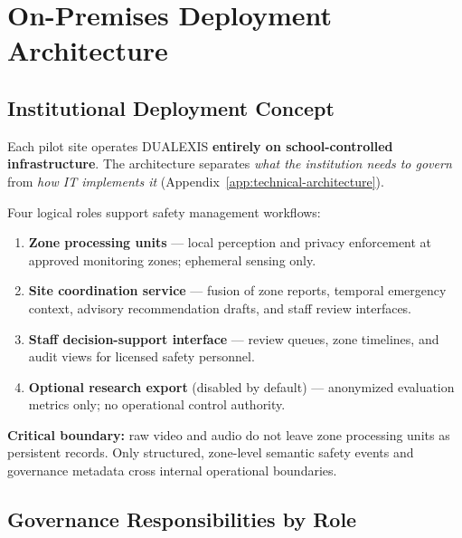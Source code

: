 \section{On-Premises Deployment Architecture}
\label{sec:edge-infrastructure-req}

\subsection{Institutional Deployment Concept}

Each pilot site operates DUALEXIS \textbf{entirely on school-controlled infrastructure}.
The architecture separates \emph{what the institution needs to govern} from \emph{how IT
implements it} (Appendix~\ref{app:technical-architecture}).

Four logical roles support safety management workflows:

\begin{enumerate}[noitemsep]
  \item \textbf{Zone processing units} --- local perception and privacy enforcement at
        approved monitoring zones; ephemeral sensing only.
  \item \textbf{Site coordination service} --- fusion of zone reports, temporal emergency
        context, advisory recommendation drafts, and staff review interfaces.
  \item \textbf{Staff decision-support interface} --- review queues, zone timelines, and
        audit views for licensed safety personnel.
  \item \textbf{Optional research export} (disabled by default) --- anonymized evaluation
        metrics only; no operational control authority.
\end{enumerate}

\textbf{Critical boundary:} raw video and audio do not leave zone processing units as
persistent records.
Only structured, zone-level semantic safety events and governance metadata cross internal
operational boundaries.

\subsection{Governance Responsibilities by Role}

